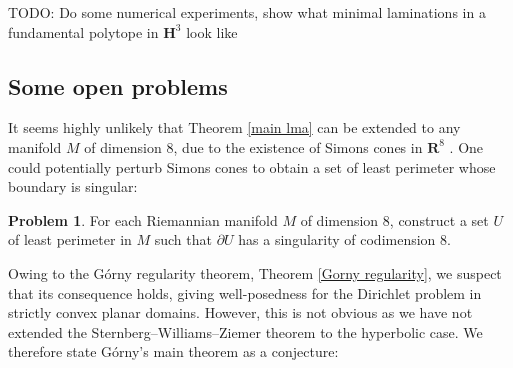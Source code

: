 \documentclass[reqno,12pt,letterpaper]{amsart}
\newcommand{\RR}{\mathbf{R}}
\newcommand{\Hyp}{\mathbf H}
\newcommand{\Orth}{\mathbf{O}}
\newtheorem{conjecture}[theorem]{Conjecture}
\theoremstyle{definition}
\newtheorem{problem}[theorem]{Problem}
\numberwithin{equation}{section}
\begin{document}
TODO: Do some numerical experiments, show what minimal laminations in a fundamental polytope in $\Hyp^3$ look like



\subsection{Some open problems}
%
%

It seems highly unlikely that Theorem \ref{main lma} can be extended to any manifold $M$ of dimension $8$, due to the existence of Simons cones in $\RR^8$ \cite[Theorem A]{BOMBIERI1969}.
One could potentially perturb Simons cones to obtain a set of least perimeter whose boundary is singular:

\begin{problem}
    For each Riemannian manifold $M$ of dimension $8$, construct a set $U$ of least perimeter in $M$ such that $\partial U$ has a singularity of codimension $8$.
\end{problem}

Owing to the G\'orny regularity theorem, Theorem \ref{Gorny regularity}, we suspect that its consequence \cite[Theorem 1.1]{górny2017planar} holds, giving well-posedness for the Dirichlet problem in strictly convex planar domains.
However, this is not obvious as we have not extended the Sternberg--Williams--Ziemer theorem \cite{ZiemerWilliamsSternberg1992} to the hyperbolic case.
We therefore state G\'orny's main theorem as a conjecture:
\end{document}
